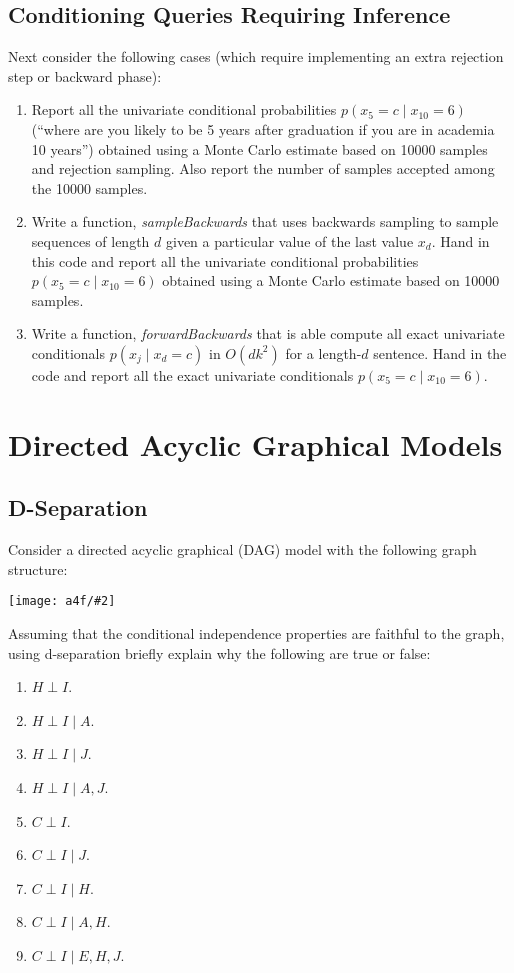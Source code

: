 \documentclass{article}
\def\blu#1{{\color{blu}#1}}
\def\red#1{{\color{red}#1}}
\def\cond{\; | \;}
\newcommand{\centerfig}[2]{\begin{center}\texttt{[image: a4f/\#2]}\end{center}}
\def\enum#1{\begin{enumerate}#1\end{enumerate}}
\begin{document}
\subsection{Conditioning Queries Requiring Inference}

Next consider the following cases (which require implementing an extra rejection step or backward phase):
\enum{
\item \blu{Report all the univariate conditional probabilities $p(x_5 = c \cond  x_{10} = 6)$ (``where are you likely to be 5 years after graduation if you are in academia 10 years'') obtained using a Monte Carlo estimate based on 10000 samples and rejection sampling. Also report the number of samples accepted among the 10000 samples.}
\item Write a function, \emph{sampleBackwards} that uses backwards sampling to sample sequences of length $d$ given a particular value of \red{the last value $x_d$}. \blu{Hand in this code and report all the univariate conditional probabilities $p(x_5 = c \cond  x_{10} = 6)$ obtained using a Monte Carlo estimate based on 10000 samples}.
\item Write a function, \emph{forwardBackwards} that is able compute all exact univariate conditionals $p(x_j \cond  x_d = c)$ in $O(dk^2)$ for a length-$d$ sentence. \blu{Hand in the code and report all the exact univariate conditionals $p(x_5 = c \cond  x_{10} = 6)$.}
}


\section{Directed Acyclic Graphical Models}


\subsection{D-Separation}

Consider a  directed acyclic graphical (DAG) model with the following graph structure:
\centerfig{.4}{DAG}

Assuming that the conditional independence properties are faithful to the graph, using d-separation \blu{briefly explain why the following are true or false:}
\enum{
\item $H \perp I$.
\item $H \perp I \cond A$.
\item $H \perp I \cond J$.
\item $H \perp I \cond A, J$.
\item $C \perp I$.
\item $C \perp I \cond J$.
\item $C \perp I \cond H$.
\item $C \perp I \cond A, H$.
\item $C \perp I \cond E, H, J$.
}
\end{document}
